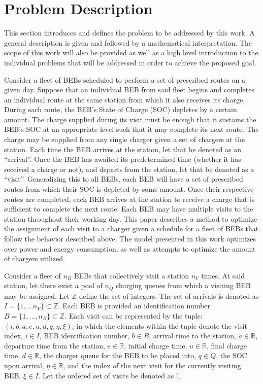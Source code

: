 \documentclass[11pt,a4paper,final]{article}
\newcommand{\visit}{(i, b, a, e, u, d, q, \eta, \xi)}
\newcommand{\I}{\mathbb{I}}                 %
\newcommand{\Iset}{I}                       %
\begin{document}
\section{Problem Description}
\label{sec:problem-description}
This section introduces and defines the problem to be addressed by this work. A general description is given and
followed by a mathematical interpretation. The scope of this work will also be provided as well as a high level
introduction to the individual problems that will be addressed in order to achieve the proposed goal.

Consider a fleet of BEBs scheduled to perform a set of prescribed routes on a given day. Suppose that an individual BEB
from said fleet begins and completes an individual route at the same station from which it also receives its charge.
During each route, the BEB's State of Charge (SOC) depletes by a certain amount. The charge supplied during its visit
must be enough that it sustains the BEB's SOC at an appropriate level such that it may complete its next route. The
charge may be supplied from any single charger given a set of chargers at the station. Each time the BEB arrives at the
station, let that be denoted as an ``arrival''. Once the BEB has awaited its predetermined time (whether it has received a
charge or not), and departs from the station, let that be denoted as a ``visit''. Generalizing this to all BEBs, each BEB
will have a set of prescribed routes from which their SOC is depleted by some amount. Once their respective routes are
completed, each BEB arrives at the station to receive a charge that is sufficient to complete the next route. Each BEB
may have multiple visits to the station throughout their working day. This paper describes a method to optimize the
assignment of each visit to a charger given a schedule for a fleet of BEBs that follow the behavior described above. The
model presented in this work optimizes over power and energy consumption, as well as attempts to optimize the amount of
chargers utilized.

Consider a fleet of \(n_B\) BEBs that collectively visit a station \(n_V\) times. At said station, let there exist a pool of
\(n_Q\) charging queues from which a visiting BEB may be assigned. Let \(\mathbb{Z}\) define the set of integers. The set of arrivals
is denoted as \(\Iset = \{ 1, ... n_V \} \subset \mathbb{Z}\). Each BEB is provided an identification number \(B = \{ 1, ..., n_B \} \subset \mathbb{Z}\).
Each visit can be represented by the tuple: \(\visit\), in which the elements within the tuple denote the visit index, \(i
\in I\), BEB identification number, \(b \in B\), arrival time to the station, \(a \in \mathbb{R}\), departure time from the station, \(e \in
\mathbb{R}\), initial charge time, \(u \in \mathbb{R}\), final charge time, \(d \in \mathbb{R}\), the charger queue for the BEB to be placed into, \(q \in Q\),
the SOC upon arrival, \(\eta \in \mathbb{R}\), and the index of the next visit for the currently visiting BEB, \(\xi \in I\). Let the ordered
set of visits be denoted as \(\I\).
\end{document}
